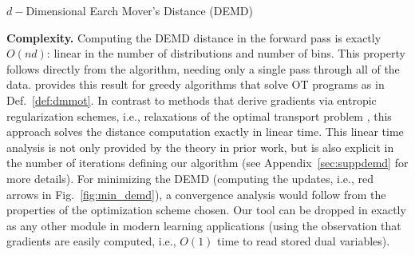 \begin{algorithm}
	\caption{ \label{alg:demdFunc} $d-$Dimensional Earch Mover's Distance (DEMD)}
	\SetAlgoLined
	\DontPrintSemicolon
\end{algorithm}


{\bf Complexity.} Computing the DEMD distance in the forward pass is exactly $O(nd)$: linear in the number of distributions and number of bins. This property follows directly from the algorithm, needing only a single pass through all of the data. \cite{BEIN199597} provides this result for greedy algorithms that solve OT programs as in Def.~\ref{def:dmmot}. {\color{blue}  In contrast to methods that derive gradients via entropic regularization schemes, i.e., relaxations of the optimal transport problem \citep{diffpropsinkwass,difftopkOT,quantnorm}, this approach solves the distance computation exactly in linear time.}
This linear time analysis is not only provided by the theory in prior work, but is also explicit in the number of iterations defining our algorithm (see Appendix~\ref{sec:suppdemd} for more details).
For minimizing the DEMD {\color{blue}(computing the updates, i.e., red arrows in Fig.~\ref{fig:min_demd})}, a convergence analysis would follow from the properties of the optimization scheme chosen. Our tool can be dropped in exactly as any other module in modern learning applications (using the observation that gradients are easily computed, i.e., $O(1)$ time to read stored dual variables). %

